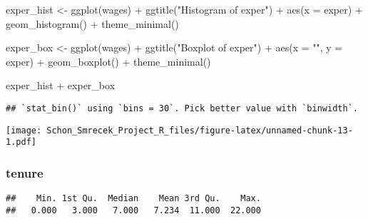 \documentclass[
]{article}
\newenvironment{Shaded}{\begin{snugshade}}{\end{snugshade}}
\newcommand{\AttributeTok}[1]{\textcolor[rgb]{0.77,0.63,0.00}{#1}}
\newcommand{\FunctionTok}[1]{\textcolor[rgb]{0.00,0.00,0.00}{#1}}
\newcommand{\NormalTok}[1]{#1}
\newcommand{\OtherTok}[1]{\textcolor[rgb]{0.56,0.35,0.01}{#1}}
\newcommand{\SpecialCharTok}[1]{\textcolor[rgb]{0.00,0.00,0.00}{#1}}
\newcommand{\StringTok}[1]{\textcolor[rgb]{0.31,0.60,0.02}{#1}}
\begin{document}
\begin{Shaded}
\begin{Highlighting}[]
\NormalTok{exper\_hist }\OtherTok{\textless{}{-}} \FunctionTok{ggplot}\NormalTok{(wages) }\SpecialCharTok{+} \FunctionTok{ggtitle}\NormalTok{(}\StringTok{"Histogram of exper"}\NormalTok{) }\SpecialCharTok{+} \FunctionTok{aes}\NormalTok{(}\AttributeTok{x =}\NormalTok{ exper) }\SpecialCharTok{+} \FunctionTok{geom\_histogram}\NormalTok{() }\SpecialCharTok{+} \FunctionTok{theme\_minimal}\NormalTok{()}

\NormalTok{exper\_box }\OtherTok{\textless{}{-}} \FunctionTok{ggplot}\NormalTok{(wages) }\SpecialCharTok{+} \FunctionTok{ggtitle}\NormalTok{(}\StringTok{"Boxplot of exper"}\NormalTok{) }\SpecialCharTok{+} \FunctionTok{aes}\NormalTok{(}\AttributeTok{x =} \StringTok{""}\NormalTok{, }\AttributeTok{y =}\NormalTok{ exper) }\SpecialCharTok{+} \FunctionTok{geom\_boxplot}\NormalTok{() }\SpecialCharTok{+} \FunctionTok{theme\_minimal}\NormalTok{()}

\NormalTok{exper\_hist }\SpecialCharTok{+}\NormalTok{ exper\_box}
\end{Highlighting}
\end{Shaded}

\begin{verbatim}
## `stat_bin()` using `bins = 30`. Pick better value with `binwidth`.
\end{verbatim}

\texttt{[image: Schon\_Smrecek\_Project\_R\_files/figure-latex/unnamed-chunk-13-1.pdf]}

\hypertarget{tenure}{%
\subsubsection{tenure}\label{tenure}}

\begin{Shaded}
\end{Shaded}

\begin{verbatim}
##    Min. 1st Qu.  Median    Mean 3rd Qu.    Max. 
##   0.000   3.000   7.000   7.234  11.000  22.000
\end{verbatim}
\end{document}
